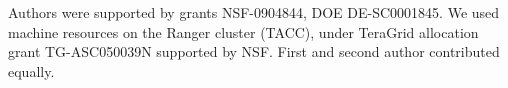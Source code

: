 \documentclass[10pt, conference, compsocconf]{IEEEtran}
\begin{document}
Authors were supported by grants 
NSF-0904844, DOE DE-SC0001845. We used machine resources on the
Ranger cluster (TACC), under TeraGrid allocation grant TG-ASC050039N supported
by NSF. First and second author contributed equally. 
%
\end{document}
